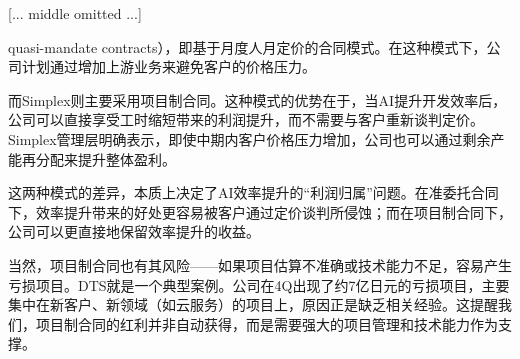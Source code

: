\documentclass[11pt]{ctexart}
\begin{document}
[... middle omitted ...]

quasi-mandate contracts），即基于月度人月定价的合同模式。在这种模式下，公司计划通过增加上游业务来避免客户的价格压力。

而Simplex则主要采用项目制合同。这种模式的优势在于，当AI提升开发效率后，公司可以直接享受工时缩短带来的利润提升，而不需要与客户重新谈判定价。Simplex管理层明确表示，即使中期内客户价格压力增加，公司也可以通过剩余产能再分配来提升整体盈利。

这两种模式的差异，本质上决定了AI效率提升的“利润归属”问题。在准委托合同下，效率提升带来的好处更容易被客户通过定价谈判所侵蚀；而在项目制合同下，公司可以更直接地保留效率提升的收益。

当然，项目制合同也有其风险——如果项目估算不准确或技术能力不足，容易产生亏损项目。DTS就是一个典型案例。公司在4Q出现了约7亿日元的亏损项目，主要集中在新客户、新领域（如云服务）的项目上，原因正是缺乏相关经验。这提醒我们，项目制合同的红利并非自动获得，而是需要强大的项目管理和技术能力作为支撑。
\end{document}
